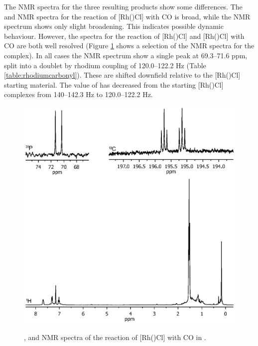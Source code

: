 The NMR spectra for the three resulting products show some differences.  The \proton{} and \carbon{} NMR spectra for the reaction of [Rh(\tButhixantphosk)Cl] with CO is broad, while the \phosphorus{} NMR spectrum shows only slight broadening.  This indicates possible dynamic behaviour.  However, the spectra for the reaction of [Rh(\tBusixantphosk)Cl] and [Rh(\tBuxantphosk)Cl] with CO are both well resolved (Figure \ref{Rhcarbonylnmr} shows a selection of the NMR spectra for the \tBuxantphos{} complex).  In all cases the \phosphorus{} NMR spectrum show a single peak at 69.3--71.6 ppm, split into a doublet by rhodium coupling of 120.0--122.2 Hz (Table \ref{table:rhodiumcarbonyl}).  These are shifted downfield relative to the [Rh(\tBuxantphosk)Cl] starting material.  The value of \JRhP{} has decreased from the starting [Rh(\tBuxantphosk)Cl] complexes from 140--142.3 Hz to 120.0--122.2 Hz.

\begin{figure}[htbp]
\begin{center}
\vspace{0.5cm}
\includegraphics[trim = 2.5cm 7.2cm 2.5cm 5.0cm, clip]{../NMR/7017.eps}
\caption[NMR spectra of [Rh(\tBusixantphos)Cl{]} with CO]{\phosphorus, \carbon{} and \proton{} NMR spectra of the reaction of [Rh(\tBusixantphos)Cl] with CO in .}
\vspace{0.2cm}
\label{Rhcarbonylnmr}
\end{center}
\end{figure}
\vspace{0.2cm}

